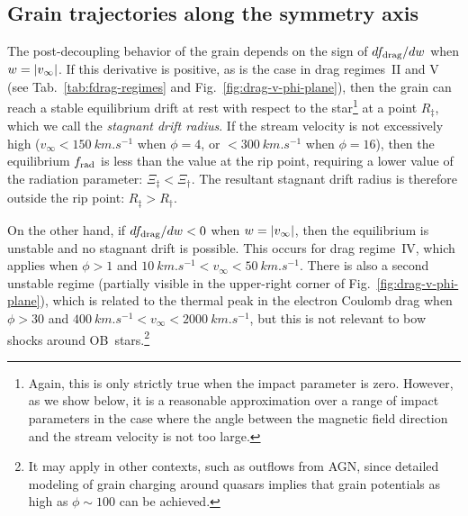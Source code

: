 \subsection{Grain trajectories along the symmetry axis}
\label{sec:grain-traj-along}

The post-decoupling behavior of the grain depends on the sign of
\(d f_{\text{drag}} / d w\) when \(w = \lvert v_\infty\rvert\).  If this derivative is
positive, as is the case in drag regimes~II and V (see
Tab.~\ref{tab:fdrag-regimes} and Fig.~\ref{fig:drag-v-phi-plane}),
then the grain can reach a stable equilibrium drift at rest with
respect to the star\footnote{%
  Again, this is only strictly true when the impact parameter is zero.
  However, as we show below, it is a reasonable approximation over a
  range of impact parameters in the case where the angle between the
  magnetic field direction and the stream velocity is not too
  large.} %
at a point \(R_\ddag\), which we call the \textit{stagnant drift
  radius}. If the stream velocity is not excessively high
(\(v_\infty < \SI{150}{km.s^{-1}}\) when \(\phi = 4\), or
\(< \SI{300}{km.s^{-1}}\) when \(\phi = 16\)), then the equilibrium
\(f_{\text{rad}}\) is less than the value at the rip point, requiring a lower
value of the radiation parameter: \(\Xi_\ddag < \Xi_\dag\).  The resultant
stagnant drift radius is therefore outside the rip point:
\(R_\ddag > R_\dag\).

On the other hand, if \(d f_{\text{drag}} / d w < 0\) when
\(w = \lvert v_\infty\rvert\), then the equilibrium is unstable and no stagnant
drift is possible.  This occurs for drag regime~IV, which applies when
\(\phi > 1\) and
\(\SI{10}{km.s^{-1}} < v_\infty < \SI{50}{km.s^{-1}}\).  There is also a
second unstable regime (partially visible in the upper-right corner of
Fig.~\ref{fig:drag-v-phi-plane}), which is related to the thermal peak
in the electron Coulomb drag when \(\phi > 30\) and
\(\SI{400}{km.s^{-1}} < v_\infty < \SI{2000}{km.s^{-1}}\), but this is not
relevant to bow shocks around OB~stars.\footnote{%
  It may apply in other contexts, such as outflows from AGN, since
  detailed modeling of grain charging around quasars
  \citep{Weingartner:2006a} implies that grain potentials as high as
  \(\phi \sim 100\) can be achieved.} %

